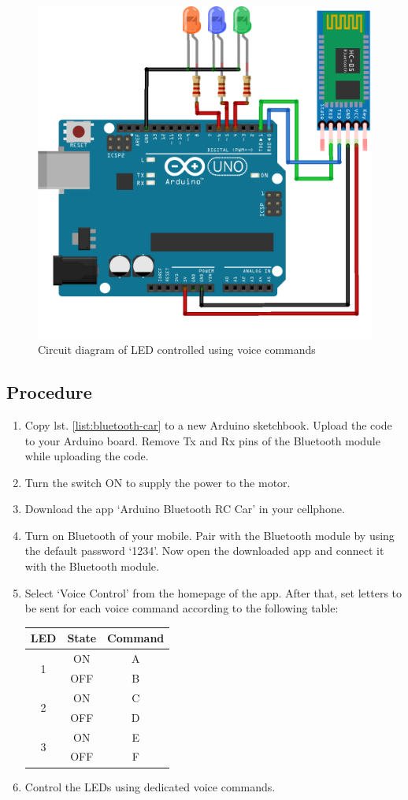 	\begin{figure}[!ht]
	\centering 
	\includegraphics[width=0.4\linewidth]{Figures/recreational_exp/led voice control_bb.png}
	\caption{Circuit diagram of LED controlled using voice commands}
	\label{fig:voice}
	\end{figure}
	
\subsection*{Procedure}

\begin{enumerate}[leftmargin=*]
    \item Copy lst. \ref{list:bluetooth-car} to a new Arduino sketchbook. Upload the code to your Arduino board. Remove Tx and Rx pins of the Bluetooth module while uploading the code.
    \item Turn the switch ON to supply the power to the motor.
    \item Download the app `Arduino Bluetooth RC Car' in your cellphone. 
    \item Turn on Bluetooth of your mobile. Pair with the Bluetooth module by using the default password `1234'. Now open the downloaded app and connect it with the Bluetooth module.  
    \item Select `Voice Control' from the homepage of the app. After that, set letters to be sent for each voice command according to the following table:
    \begin{table}[H]
        \centering
        \begin{tabular}{c|c|c}\hline
            \textbf{LED} &   \textbf{State} & \textbf{Command}\\\hline
            \multirow{2}{*}{1}   &   ON  & A \\\cline{2-3}
                                    &   OFF & B \\\hline
            \multirow{2}{*}{2}   &   ON  & C \\\cline{2-3}
                                    &   OFF & D \\\hline
            \multirow{2}{*}{3}   &   ON  & E \\\cline{2-3}
                                    &   OFF & F \\\hline
        \end{tabular}
    \end{table}
    \item Control the LEDs using dedicated voice commands.
\end{enumerate}
	
